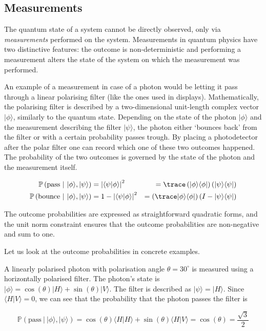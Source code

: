 \subsection{Measurements}

The quantum state of a system cannot be directly observed, only via \emph{measurements} performed on the system. Measurements in quantum physics have two distinctive features: the outcome is non-deterministic and performing a measurement alters the state of the system on which the measurement was performed.

An example of a measurement in case of a photon would be letting it pass through a linear polarising filter (like the ones used in displays). Mathematically, the polarising filter is described by a two-dimensional unit-length complex vector $\vert\phi\rangle$, similarly to the quantum state. Depending on the state of the photon $\vert\phi\rangle$ and the measurement describing the filter $\vert\psi\rangle$, the photon either `bounces back' from the filter or with a certain probability passes trough. By placing a photodetector after the polar filter one can record which one of these two outcomes happened. The probability of the two outcomes is governed by the state of the photon and the measurement itself.

\begin{align}
	\mathbb{P}\left( \mbox{pass}\ \vert\ \vert\phi\rangle , \vert\psi\rangle \right) &= \left\vert\langle\psi\vert\phi\rangle\right\vert^2 &= \trace\left(\vert\phi\rangle\langle\phi\vert\right)\left(\vert\psi\rangle\langle\psi\vert\right) \\
	\mathbb{P}\left( \mbox{bounce}\ \vert\ \vert\phi\rangle , \vert\psi\rangle \right) &= 1 - \left\vert\langle\psi\vert\phi\rangle\right\vert^2 &= \left(\trace\vert\phi\rangle\langle\phi\vert\right)\left(I - \vert\psi\rangle\langle\psi\vert\right)
\end{align}

The outcome probabilities are expressed as straightforward quadratic forms, and the unit norm constraint ensures that the outcome probabilities are non-negative and sum to one.

Let us look at the outcome probabilities in concrete examples.

\begin{example}
A linearly polarised photon with polarisation angle $\theta = 30^{\circ}$	 is measured using a horizontally polarised filter. The photon's state is $\vert\phi\rangle = \cos(\theta)\vert H \rangle + \sin(\theta)\vert V \rangle$. The filter is described as $\vert\psi\rangle = \vert H \rangle$. Since $\langle H \vert V \rangle = 0$, we can see that the probability that the photon passes the filter is

\begin{equation}
	\mathbb{P}\left( \mbox{pass}\ \vert\ \vert\phi\rangle , \vert\psi\rangle \right) = \cos(\theta)\langle H \vert H \rangle + \sin(\theta) \langle H \vert V \rangle = \cos(\theta) = \frac{\sqrt{3}}{2}
\end{equation}\end{example}

